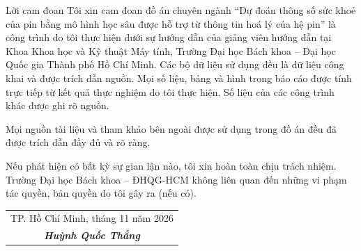 \begin{preface}{Lời cam đoan}
  Tôi xin cam đoan đồ án chuyên ngành ``Dự đoán thông số sức khoẻ của pin bằng mô hình học sâu được hỗ trợ từ thông tin
  hoá lý của hệ pin'' là công trình do tôi thực hiện dưới sự hướng dẫn của giảng viên hướng dẫn tại Khoa Khoa học và Kỹ
  thuật Máy tính, Trường Đại học Bách khoa -- Đại học Quốc gia Thành phố Hồ Chí Minh. Các bộ dữ liệu sử dụng đều là dữ
  liệu công khai và được trích dẫn nguồn. Mọi số liệu, bảng và hình trong báo cáo được tính trực tiếp từ kết quả thực
  nghiệm do tôi thực hiện. Số liệu của các công trình khác được ghi rõ nguồn.

  \noindent Mọi nguồn tài liệu và tham khảo bên ngoài được sử dụng trong đồ án đều đã được trích dẫn đầy đủ và rõ ràng.

  \noindent Nếu phát hiện có bất kỳ sự gian lận nào, tôi xin hoàn toàn chịu trách nhiệm. Trường Đại học Bách khoa --
  ĐHQG-HCM không liên quan đến những vi phạm tác quyền, bản quyền do tôi gây ra (nếu có).

  \vspace{2cm}

  \begin{flushright}
    \begin{tabular}{c}
      TP. Hồ Chí Minh, tháng 11 năm 2026 \\
      \textit{\textbf{Huỳnh Quốc Thắng}} \\
    \end{tabular}
  \end{flushright}
\end{preface}
